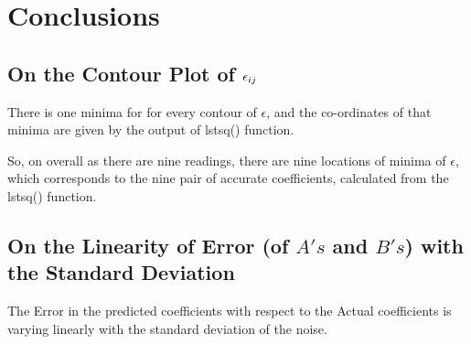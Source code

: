 \documentclass[10pt,english, openany]{book}
\begin{document}




\chapter{Conclusions}
\section{On the Contour Plot of $\large\epsilon_{ij}$}
There is one minima for for every contour of $\epsilon$, 
and the co-ordinates of that minima are given by the output of lstsq() function.\par
So, on overall as there are nine readings, there are nine locations of minima of $\epsilon$, which corresponds to the nine pair of accurate coefficients, calculated from the lstsq() function.
\section{On the Linearity of Error (of $A's$ and $B's$) with the Standard Deviation}
The Error in the predicted coefficients with respect to the Actual coefficients is varying linearly with the standard deviation of the noise.
\pagebreak


\pagebreak
\end{document}
